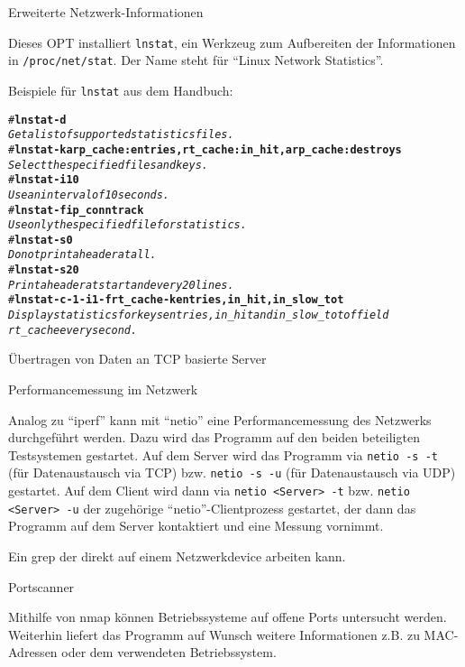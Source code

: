 \begin{description}
 Erweiterte Netzwerk-Informationen

    Dieses OPT installiert \texttt{lnstat}, ein Werkzeug zum Aufbereiten der
    Informationen in  \texttt{/proc/net/stat}. Der Name steht für ``Linux
    Network Statistics''.

    Beispiele für \texttt{lnstat} aus dem Handbuch:
    \begin{example}
    \begin{alltt}
    \# \textbf{lnstat -d}
        \textsl{Get a list of supported statistics files.}
    \# \textbf{lnstat -k arp_cache:entries,rt_cache:in_hit,arp_cache:destroys}
        \textsl{Select the specified files and keys.}
    \# \textbf{lnstat -i 10}
        \textsl{Use an interval of 10 seconds.}
    \# \textbf{lnstat -f ip_conntrack}
        \textsl{Use only the specified file for statistics.}
    \# \textbf{lnstat -s 0}
        \textsl{Do not print a header at all.}
    \# \textbf{lnstat -s 20}
        \textsl{Print a header at start and every 20 lines.}
    \# \textbf{lnstat -c -1 -i 1 -f rt_cache -k entries,in_hit,in_slow_tot}
        \textsl{Display statistics for keys entries, in_hit and in_slow_tot of field
        rt_cache every second.}
    \end{alltt}
    \end{example}

 Übertragen von Daten an TCP basierte Server

 Performancemessung im Netzwerk

    Analog zu ``iperf'' kann mit ``netio'' eine Performancemessung des
    Netzwerks durchgeführt werden. Dazu wird das Programm auf den beiden 
    beteiligten Testsystemen gestartet. Auf dem Server wird das Programm via
    \verb+netio -s -t+ (für Datenaustausch via TCP) bzw. \verb+netio -s -u+
    (für Datenaustausch via UDP) gestartet. Auf dem Client wird dann via
    \verb+netio <Server> -t+ bzw. \verb+netio <Server> -u+ der zugehörige
    ``netio''-Clientprozess gestartet, der dann das Programm auf dem Server
    kontaktiert und eine Messung vornimmt.

 Ein grep der direkt auf einem Netzwerkdevice arbeiten kann.

 Portscanner

    Mithilfe von nmap können Betriebssysteme auf offene Ports untersucht werden.
    Weiterhin liefert das Programm auf Wunsch weitere Informationen z.B. zu
    MAC-Adressen oder dem verwendeten Betriebssystem.


\end{description}
